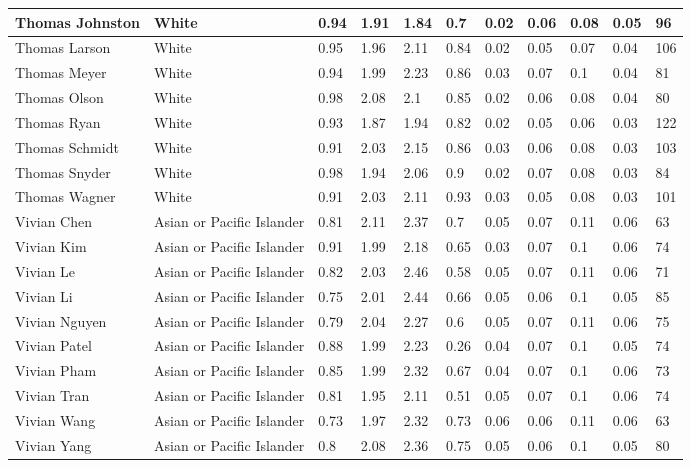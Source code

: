 \begin{table}[!ht]
\begin{tabular}{|l|l|l|l|l|l|l|l|l|l|l|}
        Thomas Johnston & White & 0.94 & 1.91 & 1.84 & 0.7 & 0.02 & 0.06 & 0.08 & 0.05 & 96 \\ \hline
        Thomas Larson & White & 0.95 & 1.96 & 2.11 & 0.84 & 0.02 & 0.05 & 0.07 & 0.04 & 106 \\ \hline
        Thomas Meyer & White & 0.94 & 1.99 & 2.23 & 0.86 & 0.03 & 0.07 & 0.1 & 0.04 & 81 \\ \hline
        Thomas Olson & White & 0.98 & 2.08 & 2.1 & 0.85 & 0.02 & 0.06 & 0.08 & 0.04 & 80 \\ \hline
        Thomas Ryan & White & 0.93 & 1.87 & 1.94 & 0.82 & 0.02 & 0.05 & 0.06 & 0.03 & 122 \\ \hline
        Thomas Schmidt & White & 0.91 & 2.03 & 2.15 & 0.86 & 0.03 & 0.06 & 0.08 & 0.03 & 103 \\ \hline
        Thomas Snyder & White & 0.98 & 1.94 & 2.06 & 0.9 & 0.02 & 0.07 & 0.08 & 0.03 & 84 \\ \hline
        Thomas Wagner & White & 0.91 & 2.03 & 2.11 & 0.93 & 0.03 & 0.05 & 0.08 & 0.03 & 101 \\ \hline
        Vivian Chen & Asian or Pacific Islander & 0.81 & 2.11 & 2.37 & 0.7 & 0.05 & 0.07 & 0.11 & 0.06 & 63 \\ \hline
        Vivian Kim & Asian or Pacific Islander & 0.91 & 1.99 & 2.18 & 0.65 & 0.03 & 0.07 & 0.1 & 0.06 & 74 \\ \hline
        Vivian Le & Asian or Pacific Islander & 0.82 & 2.03 & 2.46 & 0.58 & 0.05 & 0.07 & 0.11 & 0.06 & 71 \\ \hline
        Vivian Li & Asian or Pacific Islander & 0.75 & 2.01 & 2.44 & 0.66 & 0.05 & 0.06 & 0.1 & 0.05 & 85 \\ \hline
        Vivian Nguyen & Asian or Pacific Islander & 0.79 & 2.04 & 2.27 & 0.6 & 0.05 & 0.07 & 0.11 & 0.06 & 75 \\ \hline
        Vivian Patel & Asian or Pacific Islander & 0.88 & 1.99 & 2.23 & 0.26 & 0.04 & 0.07 & 0.1 & 0.05 & 74 \\ \hline
        Vivian Pham & Asian or Pacific Islander & 0.85 & 1.99 & 2.32 & 0.67 & 0.04 & 0.07 & 0.1 & 0.06 & 73 \\ \hline
        Vivian Tran & Asian or Pacific Islander & 0.81 & 1.95 & 2.11 & 0.51 & 0.05 & 0.07 & 0.1 & 0.06 & 74 \\ \hline
        Vivian Wang & Asian or Pacific Islander & 0.73 & 1.97 & 2.32 & 0.73 & 0.06 & 0.06 & 0.11 & 0.06 & 63 \\ \hline
        Vivian Yang & Asian or Pacific Islander & 0.8 & 2.08 & 2.36 & 0.75 & 0.05 & 0.06 & 0.1 & 0.05 & 80 \\ \hline

\end{tabular}
\end{table}

